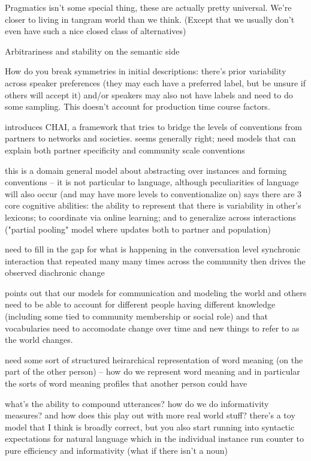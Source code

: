 \documentclass[]{article}
\begin{document}
Pragmatics isn't some special thing, these are actually pretty universal. We're closer to living in tangram world than we think. (Except that we usually don't even have such a nice closed class of alternatives) 

Arbitrariness and stability on the semantic side 

\cite{hawkins2020b} How do you break symmetries in initial descriptions: there's prior variability across speaker preferences (they may each have a preferred label, but be unsure if others will accept it) and/or speakers may also not have labels and need to do some sampling. This doesn't account for production time course factors. 

\cite{hawkins2021} introduces CHAI, a framework that tries to bridge the levels of conventions from partners to networks and societies. seems generally right; need models that can explain both partner specificity and community scale conventions

this is a domain general model about abstracting over instances and forming conventions -- it is not particular to language, although peculiarities of language will also occur (and may have more levels to conventionalize on) 
\cite{hawkins2021} says there are 3 core cognitive abilities: the ability to represent that there is variability in other's lexicons; to coordinate via online learning; and to generalize across interactions ("partial pooling" model where updates both to partner and population) 

need to fill in the gap for what is happening in the conversation level synchronic interaction that repeated many many times across the community then drives the observed diachronic change 

\cite{hawkins2021} points out that our models for communication and modeling the world and others need to be able to account for different people having different knowledge (including some tied to community membership or social role) and that vocabularies need to accomodate change over time and new things to refer to as the world changes. 


need some sort of structured heirarchical representation of word meaning (on the part of the other person) -- how do we represent word meaning and in particular the sorts of word meaning profiles that another person could have 

what's the ability to compound utterances? how do we do informativity measures? and how does this play out with more real world stuff? there's a toy model that I think is broadly correct, but you also start running into syntactic expectations for natural language which in the individual instance run counter to pure efficiency and informativity (what if there isn't a noun) 
\end{document}
